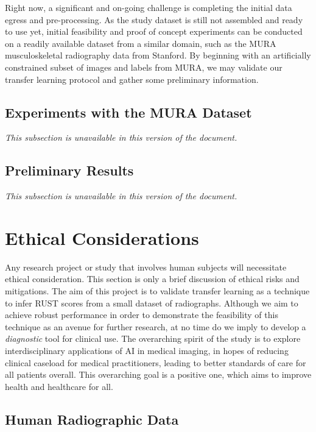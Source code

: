 Right now, a significant and on-going challenge is completing the initial data egress and pre-processing. As the study dataset is still not assembled and ready to use yet, initial feasibility and proof of concept experiments can be conducted on a readily available dataset from a similar domain, such as the MURA musculoskeletal radiography data from Stanford. By beginning with an artificially constrained subset of images and labels from MURA, we may validate our transfer learning protocol and gather some preliminary information.

\subsection{Experiments with the MURA Dataset}

\emph{This subsection is unavailable in this version of the document.}

\subsection{Preliminary Results}

\emph{This subsection is unavailable in this version of the document.}

\section{Ethical Considerations}

Any research project or study that involves human subjects will necessitate ethical consideration. This section is only a brief discussion of ethical risks and mitigations. The aim of this project is to validate transfer learning as a technique to infer RUST scores from a small dataset of radiographs. Although we aim to achieve robust performance in order to demonstrate the feasibility of this technique as an avenue for further research, at no time do we imply to develop a \emph{diagnostic} tool for clinical use. The overarching spirit of the study is to explore interdisciplinary applications of AI in medical imaging, in hopes of reducing clinical caseload for medical practitioners, leading to better standards of care for all patients overall. This overarching goal is a positive one, which aims to improve health and healthcare for all.

\subsection{Human Radiographic Data}

